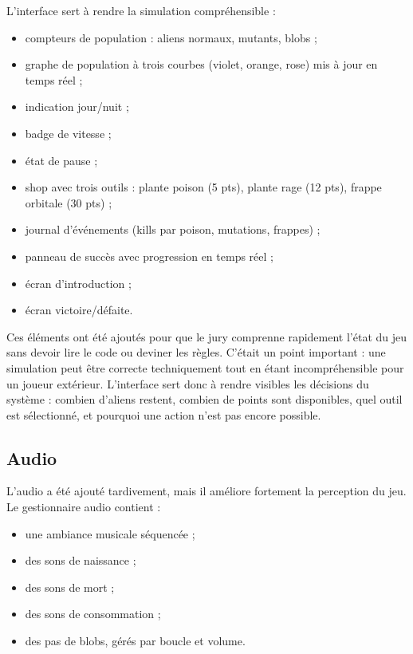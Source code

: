 ﻿\documentclass[11pt,a4paper]{article}
\begin{document}
L'interface sert à rendre la simulation compréhensible :

\begin{itemize}[noitemsep]
  \item compteurs de population : aliens normaux, mutants, blobs ;
  \item graphe de population à trois courbes (violet, orange, rose) mis à jour en temps réel ;
  \item indication jour/nuit ;
  \item badge de vitesse ;
  \item état de pause ;
  \item shop avec trois outils : plante poison (5 pts), plante rage (12 pts), frappe orbitale (30 pts) ;
  \item journal d'événements (kills par poison, mutations, frappes) ;
  \item panneau de succès avec progression en temps réel ;
  \item écran d'introduction ;
  \item écran victoire/défaite.
\end{itemize}

Ces éléments ont été ajoutés pour que le jury comprenne rapidement l'état du jeu sans devoir lire le code ou deviner les règles. C'était un point important : une simulation peut être correcte techniquement tout en étant incompréhensible pour un joueur extérieur. L'interface sert donc à rendre visibles les décisions du système : combien d'aliens restent, combien de points sont disponibles, quel outil est sélectionné, et pourquoi une action n'est pas encore possible.

\subsection{Audio}

L'audio a été ajouté tardivement, mais il améliore fortement la perception du jeu. Le gestionnaire audio contient :

\begin{itemize}[noitemsep]
  \item une ambiance musicale séquencée ;
  \item des sons de naissance ;
  \item des sons de mort ;
  \item des sons de consommation ;
  \item des pas de blobs, gérés par boucle et volume.
\end{itemize}
\end{document}
